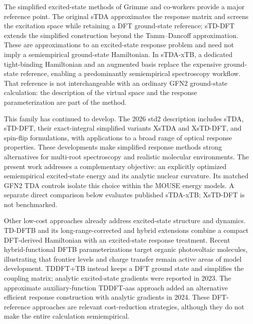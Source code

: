 \documentclass[11pt,a4paper]{article}
\begin{document}
The simplified excited-state methods of Grimme and co-workers provide a major reference point. The original sTDA approximates the response matrix and screens the excitation space while retaining a DFT ground-state reference; sTD-DFT extends the simplified construction beyond the Tamm--Dancoff approximation.\cite{tda,stdft2014} These are approximations to an excited-state response problem and need not imply a semiempirical ground-state Hamiltonian. In sTDA-xTB, a dedicated tight-binding Hamiltonian and an augmented basis replace the expensive ground-state reference, enabling a predominantly semiempirical spectroscopy workflow.\cite{stdaxtb2016} That reference is not interchangeable with an ordinary GFN2 ground-state calculation: the description of the virtual space and the response parameterization are part of the method.

This family has continued to develop. The 2026 std2 description includes sTDA, sTD-DFT, their exact-integral simplified variants XsTDA and XsTD-DFT, and spin-flip formulations, with applications to a broad range of optical response properties.\cite{std22026} These developments make simplified response methods strong alternatives for multi-root spectroscopy and realistic molecular environments. The present work addresses a complementary objective: an explicitly optimized semiempirical excited-state energy and its analytic nuclear curvature. Its matched GFN2 TDA controls isolate this choice within the MOUSE energy models. A separate direct comparison below evaluates published sTDA-xTB; XsTD-DFT is not benchmarked.

Other low-cost approaches already address excited-state structure and dynamics. TD-DFTB and its long-range-corrected and hybrid extensions combine a compact DFT-derived Hamiltonian with an excited-state response treatment. Recent hybrid-functional DFTB parameterizations target organic photovoltaic molecules, illustrating that frontier levels and charge transfer remain active areas of model development.\cite{dftb2025,hybriddftb2025} TDDFT+TB instead keeps a DFT ground state and simplifies the coupling matrix; analytic excited-state gradients were reported in 2023.\cite{tbgrad2023} The approximate auxiliary-function TDDFT-aas approach added an alternative efficient response construction with analytic gradients in 2024.\cite{aas2024} These DFT-reference approaches are relevant cost-reduction strategies, although they do not make the entire calculation semiempirical.
\end{document}
